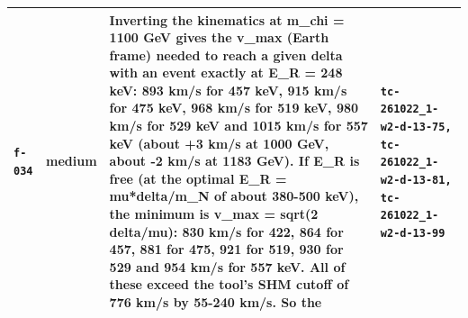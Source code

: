 \documentclass[11pt,a4paper]{article}
\begin{document}
\begin{longtable}{@{}p{}p{}p{}p{}@{}}
\texttt{f-034} & medium & Inverting the kinematics at m\_chi = 1100 GeV gives the v\_max (Earth frame) needed to reach a given delta with an event exactly at E\_R = 248 keV: 893 km/s for 457 keV, 915 km/s for 475 keV, 968 km/s for 519 keV, 980 km/s for 529 keV and 1015 km/s for 557 keV (about +3 km/s at 1000 GeV, about -2 km/s at 1183 GeV). If E\_R is free (at the optimal E\_R = mu*delta/m\_N of about 380-500 keV), the minimum is v\_max = sqrt(2 delta/mu): 830 km/s for 422, 864 for 457, 881 for 475, 921 for 519, 930 for 529 and 954 km/s for 557 keV. All of these exceed the tool's SHM cutoff of 776 km/s by 55-240 km/s. So the  & \texttt{tc-261022\_\allowbreak{}1-w2-d-13-75,\allowbreak{} tc-261022\_\allowbreak{}1-w2-d-13-81,\allowbreak{} tc-261022\_\allowbreak{}1-w2-d-13-99} \\
\bottomrule\end{longtable}
\end{document}
